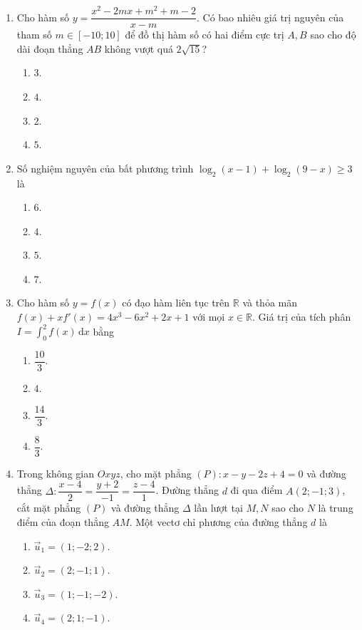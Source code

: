\documentclass[12pt,a4paper]{article}
\begin{document}
\begin{enumerate}[label=\textbf{Câu \arabic*:}, leftmargin=*]

\item Cho hàm số $y = \dfrac{x^2 - 2mx + m^2 + m - 2}{x - m}$. Có bao nhiêu giá trị nguyên của tham số $m \in [-10; 10]$ để đồ thị hàm số có hai điểm cực trị $A, B$ sao cho độ dài đoạn thẳng $AB$ không vượt quá $2\sqrt{15}$?
\begin{enumerate}[label=\Alph*.]
    \item $3$.
    \item $4$.
    \item $2$.
    \item $5$.
\end{enumerate}

\item Số nghiệm nguyên của bất phương trình $\log_2(x - 1) + \log_2(9 - x) \ge 3$ là
\begin{enumerate}[label=\Alph*.]
    \item $6$.
    \item $4$.
    \item $5$.
    \item $7$.
\end{enumerate}

\item Cho hàm số $y = f(x)$ có đạo hàm liên tục trên $\mathbb{R}$ và thỏa mãn $f(x) + x f'(x) = 4x^3 - 6x^2 + 2x + 1$ với mọi $x \in \mathbb{R}$. Giá trị của tích phân $I = \int_0^2 f(x)\,\mathrm{d}x$ bằng
\begin{enumerate}[label=\Alph*.]
    \item $\dfrac{10}{3}$.
    \item $4$.
    \item $\dfrac{14}{3}$.
    \item $\dfrac{8}{3}$.
\end{enumerate}

\item Trong không gian $Oxyz$, cho mặt phẳng $(P): x - y - 2z + 4 = 0$ và đường thẳng $\Delta: \dfrac{x - 4}{2} = \dfrac{y + 2}{-1} = \dfrac{z - 4}{1}$. Đường thẳng $d$ đi qua điểm $A(2; -1; 3)$, cắt mặt phẳng $(P)$ và đường thẳng $\Delta$ lần lượt tại $M, N$ sao cho $N$ là trung điểm của đoạn thẳng $AM$. Một vectơ chỉ phương của đường thẳng $d$ là
\begin{enumerate}[label=\Alph*.]
    \item $\vec{u}_1 = (1; -2; 2)$.
    \item $\vec{u}_2 = (2; -1; 1)$.
    \item $\vec{u}_3 = (1; -1; -2)$.
    \item $\vec{u}_4 = (2; 1; -1)$.
\end{enumerate}


\end{enumerate}
\end{document}
